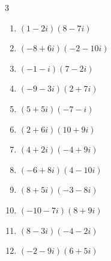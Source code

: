 \begin{multicols}{3}
\begin{enumerate}
        \phantom{$\displaystyle =8-12i$}

  \item $\displaystyle (1-2i)(8-7i)$

        \phantom{$\displaystyle =-6-23i$}

  \item $\displaystyle (-8+6i)(-2-10i)$

        \phantom{$\displaystyle =76+68i$}

  \item $\displaystyle (-1-i)(7-2i)$

        \phantom{$\displaystyle =-9-5i$}

  \item $\displaystyle (-9-3i)(2+7i)$

        \phantom{$\displaystyle =3-69i$}

  \item $\displaystyle (5+5i)(-7-i)$

        \phantom{$\displaystyle =-30-40i$}

  \item $\displaystyle (2+6i)(10+9i)$

        \phantom{$\displaystyle =-34+78i$}

  \item $\displaystyle (4+2i)(-4+9i)$

        \phantom{$\displaystyle =-34+28i$}

  \item $\displaystyle (-6+8i)(4-10i)$

        \phantom{$\displaystyle =56+92i$}

  \item $\displaystyle (8+5i)(-3-8i)$

        \phantom{$\displaystyle =16-79i$}

  \item $\displaystyle (-10-7i)(8+9i)$

        \phantom{$\displaystyle =-17-146i$}

\columnbreak %

\resetques

  \item $\displaystyle (8-3i)(-4-2i)$

        \phantom{$\displaystyle =-38-4i$}

  \item $\displaystyle (-2-9i)(6+5i)$

        \phantom{$\displaystyle =33-64i$}


\end{enumerate}
\end{multicols}
